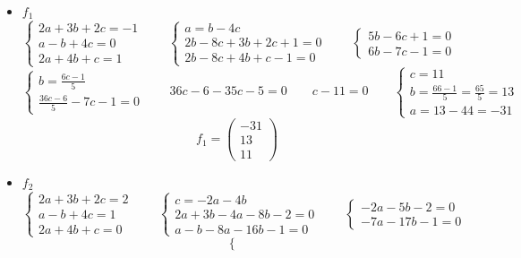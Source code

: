 \begin{itemize}
	\item $ f_1 $
    $$
    \begin{cases}
    	2a + 3b + 2c = - 1 \\
        a - b + 4c = 0 \\
        2a + 4b + c = 1
    \end{cases} \qquad
    \begin{cases}
    	a = b - 4c \\
        2b - 8c + 3b + 2c + 1 = 0 \\
        2b - 8c + 4b + c - 1 = 0
    \end{cases} \qquad
    \begin{cases}
    	5b - 6c + 1 = 0 \\
        6b - 7c - 1 = 0
    \end{cases} $$
    $$
    \begin{cases}
        b = \frac{6c - 1}5 \\
        \frac{36c - 6}5 - 7c - 1 = 0
    \end{cases} \qquad 36c - 6 - 35c - 5 = 0 \qquad c - 11 = 0 \qquad
    \begin{cases}
    	c = 11 \\
        b = \frac{66 - 1}5 = \frac{65}5 = 13 \\
        a = 13 - 44 = -31
    \end{cases} $$
    $$ f_1 =
    \begin{pmatrix}
    	-31 \\
        13 \\
        11
    \end{pmatrix} $$
    \item $ f_2 $
    $$
    \begin{cases}
    	2a + 3b + 2c = 2 \\
        a - b + 4c = 1 \\
        2a + 4b + c = 0
    \end{cases} \qquad
    \begin{cases}
    	c = -2a - 4b \\
        2a + 3b - 4a - 8b - 2 = 0 \\
        a - b - 8a - 16b - 1 = 0
    \end{cases} \qquad
    \begin{cases}
    	-2a - 5b - 2 = 0 \\
        -7a - 17b - 1 = 0
    \end{cases} $$
    $$
    \begin{cases}

\end{cases}$$
\end{itemize}
